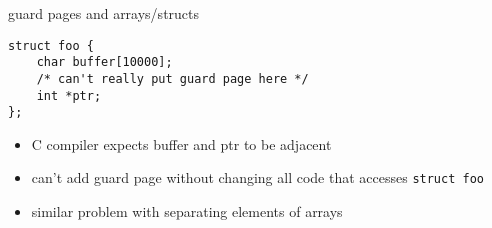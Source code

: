 \begin{frame}[fragile]{guard pages and arrays/structs}
\begin{Verbatim}
struct foo {
    char buffer[10000];
    /* can't really put guard page here */
    int *ptr;
};
\end{Verbatim}
\begin{itemize}
\item C compiler expects buffer and ptr to be adjacent
\item can't add guard page without changing all code that accesses \texttt{struct foo}
\item similar problem with separating elements of arrays
\end{itemize}
\end{frame}
